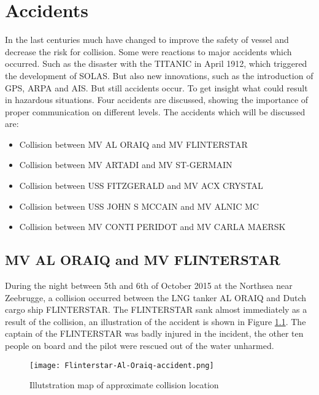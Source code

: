 \chapter{Accidents}
\label{app:accidents}
In the last centuries much have changed to improve the safety of vessel and decrease the risk for collision. Some were reactions to major accidents which occurred. Such as the disaster with the TITANIC in April 1912, which triggered the development of \ac{SOLAS}. But also new innovations, such as the introduction of \ac{GPS}, \ac{ARPA} and \ac{AIS}. But still accidents occur. To get insight what could result in hazardous situations. Four accidents are discussed, showing the importance of proper communication on different levels. The accidents which will be discussed are:
\begin{itemize}
	\item Collision between MV AL ORAIQ and MV FLINTERSTAR
	\item Collision between MV ARTADI and MV ST-GERMAIN
	\item Collision between USS FITZGERALD and MV ACX CRYSTAL
	\item Collision between USS JOHN S MCCAIN and MV ALNIC MC
	\item Collision between MV CONTI PERIDOT and MV CARLA MAERSK
\end{itemize}

\newpage
\section{MV AL ORAIQ and MV FLINTERSTAR}
\label{sec:al-oraiq-vs-flinterstar}
During the night between 5th and 6th of October 2015 at the Northsea near Zeebrugge, a collision occurred between the LNG tanker AL ORAIQ and Dutch cargo ship FLINTERSTAR. The FLINTERSTAR sank almost immediately as a result of the collision, an illustration of the accident is shown in Figure \ref{fig:Accident-Flinterstar-Al-Oraiq}. The captain of the FLINTERSTAR was badly injured in the incident, the other ten people on board and the pilot were rescued out of the water unharmed.

\begin{figure}[H]
	\centering
	\texttt{[image: Flinterstar-Al-Oraiq-accident.png]}
	\caption{Illutstration map of approximate collision location}
	\label{fig:Accident-Flinterstar-Al-Oraiq}
\end{figure}

